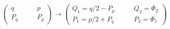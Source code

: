 \begin{equation}
\left( 
\begin{array}{ll}
q & \qquad p \\ 
{P_{q}} & \qquad {P_{p}}%
\end{array}%
\right) \rightarrow \left( 
\begin{array}{ll}
Q_{1}=q/2-P_{p} & \qquad Q_{2}=\Phi _{2} \\ 
P_{1}=p/2+P_{q} & \qquad P_{2}={\Phi _{1}}%
\end{array}%
\right)   \label{chart2}
\end{equation}%

